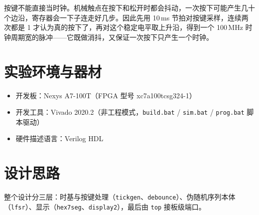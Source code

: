 \documentclass[12pt, a4paper]{ctexart}
\begin{document}
按键不能直接当时钟。机械触点在按下和松开时都会抖动，一次按下可能产生几十个边沿，寄存器会一下子连走好几步。因此先用 10\,ms 节拍对按键采样，连续两次都是 1 才认为真的按下了，再对这个稳定电平取上升沿，得到一个 100\,MHz 时钟周期宽的脉冲——它既做消抖，又保证一次按下只产生一个时钟。

\section{实验环境与器材}
\begin{itemize}
    \item 开发板：Nexys A7-100T（FPGA 型号 xc7a100tcsg324-1）
    \item 开发工具：Vivado 2020.2（非工程模式，\texttt{build.bat} / \texttt{sim.bat} / \texttt{prog.bat} 脚本驱动）
    \item 硬件描述语言：Verilog HDL
\end{itemize}

\section{设计思路}

整个设计分三层：时基与按键处理（\texttt{tickgen}、\texttt{debounce}）、伪随机序列本体（\texttt{lfsr}）、显示（\texttt{hex7seg}、\texttt{display2}），最后由 \texttt{top} 接板级端口。
\end{document}
